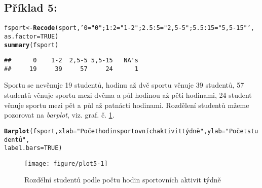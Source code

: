 \documentclass[twoside]{article}\usepackage[]{graphicx}\usepackage[]{color}
\makeatletter
\def\maxwidth{ %
  \ifdim\Gin@nat@width>\linewidth
    \linewidth
  \else
    \Gin@nat@width
  \fi
}
\newcommand{\hlnum}[1]{\textcolor[rgb]{0.686,0.059,0.569}{#1}}%
\newcommand{\hlstr}[1]{\textcolor[rgb]{0.192,0.494,0.8}{#1}}%
\newcommand{\hlstd}[1]{\textcolor[rgb]{0.345,0.345,0.345}{#1}}%
\newcommand{\hlkwb}[1]{\textcolor[rgb]{0.69,0.353,0.396}{#1}}%
\newcommand{\hlkwc}[1]{\textcolor[rgb]{0.333,0.667,0.333}{#1}}%
\newcommand{\hlkwd}[1]{\textcolor[rgb]{0.737,0.353,0.396}{\textbf{#1}}}%
\newenvironment{kframe}{%
 \def\at@end@of@kframe{}%
 \ifinner\ifhmode%
  \def\at@end@of@kframe{\end{minipage}}%
  \begin{minipage}{\columnwidth}%
 \fi\fi%
 \def\FrameCommand##1{\hskip\@totalleftmargin \hskip-\fboxsep
 \colorbox{shadecolor}{##1}\hskip-\fboxsep
     \hskip-\linewidth \hskip-\@totalleftmargin \hskip\columnwidth}%
 \MakeFramed {\advance\hsize-\width
   \@totalleftmargin\z@ \linewidth\hsize
   \@setminipage}}%
 {\par\unskip\endMakeFramed%
 \at@end@of@kframe}
\newenvironment{knitrout}{}{} %
\makeatother
\begin{document}
\subsection*{Příklad 5:}
\begin{knitrout}
\color{fgcolor}\begin{kframe}
\begin{alltt}
\hlstd{fsport} \hlkwb{<-} \hlkwd{Recode}\hlstd{(sport,} \hlstr{'0="0"; 1:2="1-2"; 2.5:5="2,5-5"; 5.5:15="5,5-15"'}\hlstd{,}
    \hlkwc{as.factor}\hlstd{=}\hlnum{TRUE}\hlstd{)}
\hlkwd{summary}\hlstd{(fsport)}
\end{alltt}
\begin{verbatim}
##      0    1-2  2,5-5 5,5-15   NA's 
##     19     39     57     24      1
\end{verbatim}
\end{kframe}
\end{knitrout}

Sportu se nevěnuje 19 studentů, hodinu až dvě sportu věnuje 39 studentů, 57 studentů věnuje sportu mezi dvěma a půl hodinou až pěti hodinami, 24 student věnuje sportu mezi pět a půl až patnácti hodinami. Rozdělení studentů mžeme pozorovat na \emph{barplot}, viz. graf. č. \ref{fig:plot5}.

\begin{knitrout}
\color{fgcolor}\begin{kframe}
\begin{alltt}
\hlkwd{Barplot}\hlstd{(fsport,} \hlkwc{xlab}\hlstd{=}\hlstr{"Počet hodin sportovních aktivit týdně"}\hlstd{,} \hlkwc{ylab}\hlstd{=}\hlstr{"Počet studentů"}\hlstd{,}
    \hlkwc{label.bars}\hlstd{=}\hlnum{TRUE}\hlstd{)}
\end{alltt}
\end{kframe}\begin{figure}[h]
\texttt{[image: figure/plot5-1]} \caption[Rozdělní studentů podle počtu hodin sportovních aktivit týdně]{Rozdělní studentů podle počtu hodin sportovních aktivit týdně}\label{fig:plot5}
\end{figure}


\end{knitrout}

\newpage
\end{document}
